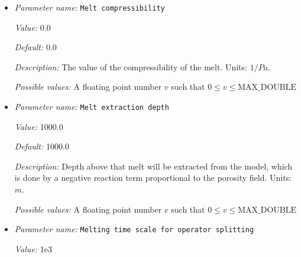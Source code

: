 \begin{itemize}
{\it Value:} 0.0


{\it Default:} 0.0


{\it Description:} The value of the pressure derivative of the melt bulk modulus. Units: None.


{\it Possible values:} A floating point number $v$ such that $0 \leq v \leq \text{MAX\_DOUBLE}$
\item {\it Parameter name:} {\tt Melt compressibility}
\label{parameters:Material model/Melt simple/Melt compressibility}
\label{parameters:Material_20model/Melt_20simple/Melt_20compressibility}


{\it Value:} 0.0


{\it Default:} 0.0


{\it Description:} The value of the compressibility of the melt. Units: $1/Pa$.


{\it Possible values:} A floating point number $v$ such that $0 \leq v \leq \text{MAX\_DOUBLE}$
\item {\it Parameter name:} {\tt Melt extraction depth}
\label{parameters:Material model/Melt simple/Melt extraction depth}
\label{parameters:Material_20model/Melt_20simple/Melt_20extraction_20depth}


{\it Value:} 1000.0


{\it Default:} 1000.0


{\it Description:} Depth above that melt will be extracted from the model, which is done by a negative reaction term proportional to the porosity field. Units: $m$.


{\it Possible values:} A floating point number $v$ such that $0 \leq v \leq \text{MAX\_DOUBLE}$
\item {\it Parameter name:} {\tt Melting time scale for operator splitting}
\label{parameters:Material model/Melt simple/Melting time scale for operator splitting}
\label{parameters:Material_20model/Melt_20simple/Melting_20time_20scale_20for_20operator_20splitting}


{\it Value:} 1e3



\end{itemize}
